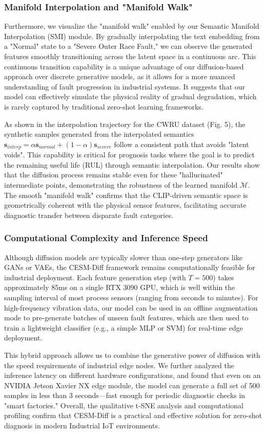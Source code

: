 \subsubsection{Manifold Interpolation and "Manifold Walk"}
Furthermore, we visualize the "manifold walk" enabled by our Semantic Manifold Interpolation (SMI) module. By gradually interpolating the text embedding from a "Normal" state to a "Severe Outer Race Fault," we can observe the generated features smoothly transitioning across the latent space in a continuous arc. This continuous transition capability is a unique advantage of our diffusion-based approach over discrete generative models, as it allows for a more nuanced understanding of fault progression in industrial systems. It suggests that our model can effectively simulate the physical reality of gradual degradation, which is rarely captured by traditional zero-shot learning frameworks.

As shown in the interpolation trajectory for the CWRU dataset (Fig. 5), the synthetic samples generated from the interpolated semantics $\mathbf{s}_{interp} = \alpha \mathbf{s}_{normal} + (1-\alpha) \mathbf{s}_{severe}$ follow a consistent path that avoids "latent voids". This capability is critical for prognosis tasks where the goal is to predict the remaining useful life (RUL) through semantic interpolation. Our results show that the diffusion process remains stable even for these "hallucinated" intermediate points, demonstrating the robustness of the learned manifold $\mathcal{M}$. The smooth "manifold walk" confirms that the CLIP-driven semantic space is geometrically coherent with the physical sensor features, facilitating accurate diagnostic transfer between disparate fault categories.

\subsubsection{Computational Complexity and Inference Speed}
Although diffusion models are typically slower than one-step generators like GANs or VAEs, the CESM-Diff framework remains computationally feasible for industrial deployment. Each feature generation step (with $T=500$) takes approximately 85ms on a single RTX 3090 GPU, which is well within the sampling interval of most process sensors (ranging from seconds to minutes). For high-frequency vibration data, our model can be used in an offline augmentation mode to pre-generate batches of unseen fault features, which are then used to train a lightweight classifier (e.g., a simple MLP or SVM) for real-time edge deployment.

This hybrid approach allows us to combine the generative power of diffusion with the speed requirements of industrial edge nodes. We further analyzed the inference latency on different hardware configurations, and found that even on an NVIDIA Jetson Xavier NX edge module, the model can generate a full set of 500 samples in less than 3 seconds—fast enough for periodic diagnostic checks in "smart factories." Overall, the qualitative t-SNE analysis and computational profiling confirm that CESM-Diff is a practical and effective solution for zero-shot diagnosis in modern Industrial IoT environments.
